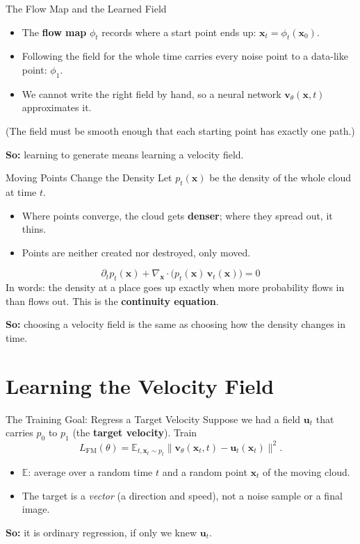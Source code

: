 \documentclass{ntuabeamer}
\begin{document}
\begin{frame}{The Flow Map and the Learned Field}
  \begin{itemize}
    \item The \textbf{flow map} \(\phi_t\) records where a start point ends up: \(\mathbf x_t=\phi_t(\mathbf x_0)\).
    \item Following the field for the whole time carries every noise point to a data-like point: \(\phi_1\).
    \item We cannot write the right field by hand, so a neural network \(\mathbf v_\theta(\mathbf x,t)\) approximates it.
  \end{itemize}
  (The field must be smooth enough that each starting point has exactly one path.)

  \medskip
  \textbf{So:} learning to generate means learning a velocity field.
\end{frame}

\begin{frame}{Moving Points Change the Density}
  Let \(p_t(\mathbf x)\) be the density of the whole cloud at time \(t\).
  \begin{itemize}
    \item Where points converge, the cloud gets \textbf{denser}; where they spread out, it thins.
    \item Points are neither created nor destroyed, only moved.
  \end{itemize}
  \[
    \boxed{\partial_t p_t(\mathbf x)+\nabla_{\mathbf x}\cdot\big(p_t(\mathbf x)\,\mathbf v_t(\mathbf x)\big)=0}
  \]
  In words: the density at a place goes up exactly when more probability flows in than flows out.
  This is the \textbf{continuity equation}.

  \medskip
  \textbf{So:} choosing a velocity field is the same as choosing how the density changes in time.
\end{frame}

\section{Learning the Velocity Field}

\begin{frame}{The Training Goal: Regress a Target Velocity}
  Suppose we had a field \(\mathbf u_t\) that carries \(p_0\) to \(p_1\) (the \textbf{target velocity}). Train
  \[
    \boxed{L_{\mathrm{FM}}(\theta)=\mathbb E_{t,\mathbf x_t\sim p_t}\big\|\mathbf v_\theta(\mathbf x_t,t)-\mathbf u_t(\mathbf x_t)\big\|^2}.
  \]
  \begin{itemize}
    \item \(\mathbb E\): average over a random time \(t\) and a random point \(\mathbf x_t\) of the moving cloud.
    \item The target is a \emph{vector} (a direction and speed), not a noise sample or a final image.
  \end{itemize}
  \textbf{So:} it is ordinary regression, if only we knew \(\mathbf u_t\).
\end{frame}
\end{document}
